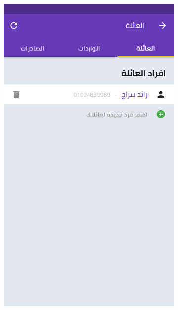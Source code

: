 \begin{figure}[H]
\begin{subfigure}[b]{0.5\linewidth}
    \label{fig7:d} 
  \end{subfigure}%
    \begin{subfigure}[b]{0.5\linewidth}
    \centering
    \includegraphics[width=0.5\linewidth]{images/ch3/family/4.png}
  
    \label{fig7:e} 
  \end{subfigure}%
  \label{fig7} 
\end{figure}
